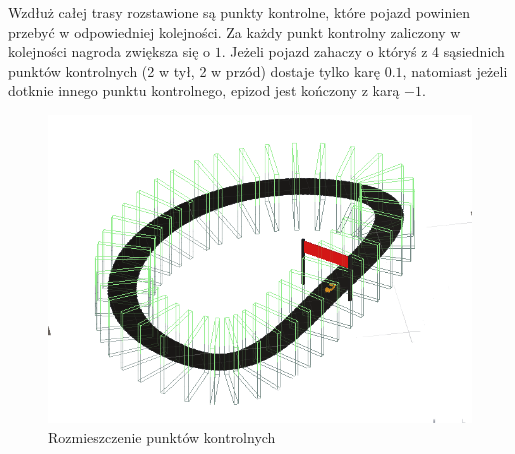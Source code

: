Wzdłuż całej trasy rozstawione są punkty kontrolne, które pojazd powinien przebyć w odpowiedniej kolejności. Za każdy punkt kontrolny zaliczony w kolejności nagroda zwiększa się o $1$. Jeżeli pojazd zahaczy o któryś z 4 sąsiednich punktów kontrolnych (2 w tył, 2 w przód) dostaje tylko karę $0.1$, natomiast jeżeli dotknie innego punktu kontrolnego, epizod jest kończony z karą $-1$.
\begin{figure}[H]
    \centering
    \includegraphics[width=.5\textwidth]{figures/checkpoints}
    \caption{Rozmieszczenie punktów kontrolnych}
    \label{fig}
\end{figure}

